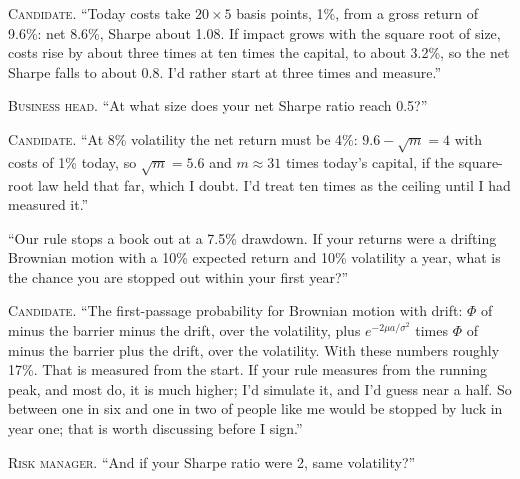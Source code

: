 \noindent\textsc{Candidate.} ``Today costs take $20 \times 5$ basis points, 1\%, from a gross return of 9.6\%: net 8.6\%, Sharpe
about 1.08. If impact grows with the square root of size, costs rise by about three times at ten times the capital, to about 3.2\%,
so the net Sharpe falls to about 0.8. I'd rather start at three times and measure.''


\noindent\textsc{Business head.} ``At what size does your net Sharpe ratio reach 0.5?''

\noindent\textsc{Candidate.} ``At 8\% volatility the net return must be 4\%: $9.6 - \sqrt{m} = 4$ with costs of 1\% today, so $\sqrt m =
5.6$ and $m \approx 31$ times today's capital, if the square-root law held that far, which I doubt. I'd treat ten times as the
ceiling until I had measured it.''


\begin{interviewq}\label{iq:iv:mock-interviews:18}
``Our rule stops a book out at a 7.5\% drawdown. If your returns were a drifting Brownian motion with a 10\% expected return and 10\%
volatility a year, what is the chance you are stopped out within your first year?''
\end{interviewq}

\noindent\textsc{Candidate.} ``The first-passage probability for Brownian motion with drift: $\Phi$ of minus the barrier minus the
drift, over the volatility, plus $e^{-2\mu a/\sigma^2}$ times $\Phi$ of minus the barrier plus the drift, over the volatility.
With these numbers roughly 17\%. That is measured from the start. If your rule measures from the running peak, and most do, it
is much higher; I'd simulate it, and I'd guess near a half. So between one in six and one in two of people like me would be
stopped by luck in year one; that is worth discussing before I sign.''


\noindent\textsc{Risk manager.} ``And if your Sharpe ratio were 2, same volatility?''

